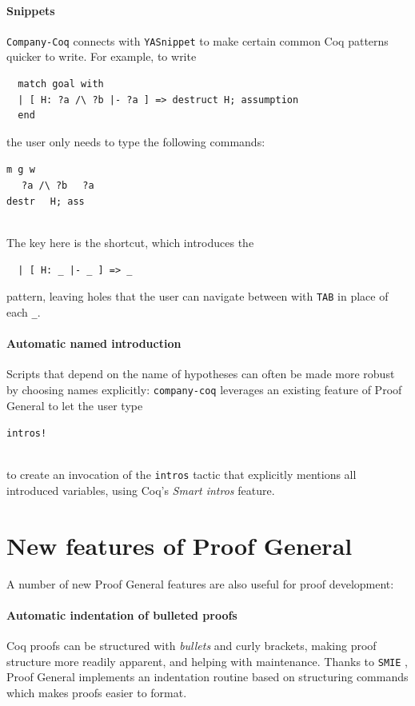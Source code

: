 \documentclass[preprint]{sigplanconf}
\newlength{\almostverbatimindentation}
\newenvironment{almostverbatim}{%
\sbox0{\texttt{\global\almostverbatimindentation=2\fontdimen2\font}}
\\[\topsep]\hspace*{\almostverbatimindentation}\begin{minipage}{0.94\linewidth}\setlength{\baselineskip}{1.5\baselineskip}%
}{%
\end{minipage}\\[\topsep]
}
\newcommand{\proofg}{Proof General\xspace}
\begin{document}
\paragraph{Snippets} \texttt{Company-Coq} connects with \texttt{YASnippet} to make certain common Coq patterns quicker to write. For example, to write
\begin{verbatim}
  match goal with
  | [ H: ?a /\ ?b |- ?a ] => destruct H; assumption
  end
\end{verbatim}
the user only needs to type the following commands:
\begin{almostverbatim}
  \verb|m g w | \keys{\return}\\
  \keys{\Alt+\shift+\return} \verb| | \keys{\tab} \verb| ?a /\ ?b | \keys{\tab} \verb| ?a | \keys{\tab}\\
  \verb|destr | \keys{\return} \verb| H; ass | \keys{\return}
\end{almostverbatim}
The key here is the \keys{\Alt+\shift+\return} shortcut, which introduces the
\begin{verbatim}
  | [ H: _ |- _ ] => _
\end{verbatim}
pattern, leaving holes that the user can navigate between with \texttt{TAB} in place of each \texttt{\_}.

\paragraph{Automatic named introduction} Scripts that depend on the name of hypotheses can often be made more robust by choosing names explicitly: \texttt{company-coq} leverages an existing feature of \proofg to let the user type
\begin{almostverbatim}
  \verb|intros! |\keys{\return}
\end{almostverbatim}
to create an invocation of the \texttt{intros} tactic that explicitly mentions all introduced variables, using Coq's \emph{Smart intros} feature.

\section*{New features of \proofg}

A number of new \proofg features are also useful for proof development:

\paragraph{Automatic indentation of bulleted proofs} Coq proofs can be structured with \emph{bullets} and curly brackets, making proof structure more readily apparent, and helping with maintenance. Thanks to \texttt{SMIE} \cite{SMIE}, \proofg implements an indentation routine based on structuring commands which makes proofs easier to format.
\end{document}
